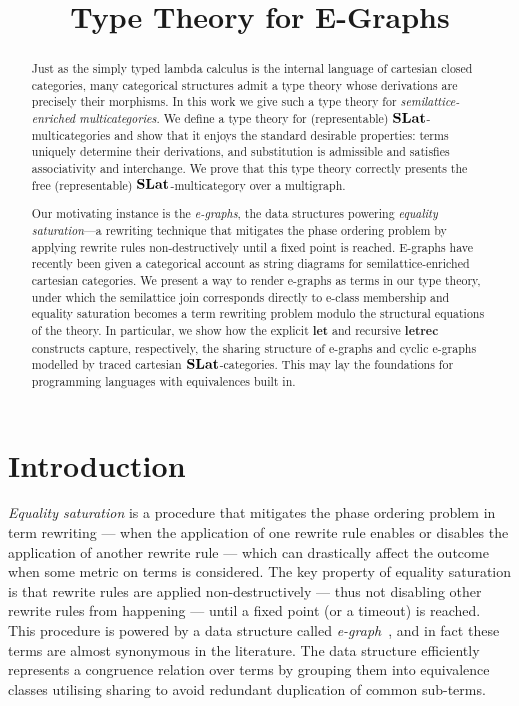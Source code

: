 \documentclass[manuscript, nonacm, anonymous]{acmart}
\title{Type Theory for E-Graphs}
\begin{document}
\begin{abstract}
Just as the simply typed lambda calculus is the internal language of cartesian
closed categories, many categorical structures admit a type theory whose
derivations are precisely their morphisms. In this work we give such a type
theory for \emph{semilattice-enriched multicategories}. We define a type theory
for (representable) $\mathbf{SLat}$-multicategories and show that it enjoys the
standard desirable properties: terms uniquely determine their derivations, and
substitution is admissible and satisfies associativity and interchange. We prove
that this type theory correctly presents the free (representable)
$\mathbf{SLat}$-multicategory over a multigraph.

Our motivating instance is the \emph{e-graphs}, the data structures powering
\emph{equality saturation}---a rewriting technique that mitigates the phase
ordering problem by applying rewrite rules non-destructively until a fixed point
is reached. E-graphs have recently been given a categorical account as string
diagrams for semilattice-enriched cartesian categories. We present a way to
render e-graphs as terms in our type theory, under which the semilattice join
corresponds directly to e-class membership and equality saturation becomes a
term rewriting problem modulo the structural equations of the theory. In
particular, we show how the explicit \textbf{let} and recursive \textbf{letrec}
constructs capture, respectively, the sharing structure of e-graphs and cyclic
e-graphs modelled by traced cartesian $\mathbf{SLat}$-categories. This may lay
the foundations for programming languages with equivalences built in.
\end{abstract}
\maketitle

\section{Introduction}

\emph{Equality saturation} is a procedure that mitigates the phase ordering problem in term rewriting --- when the application of one rewrite rule enables or disables the application of another rewrite rule --- which can drastically affect the outcome when some metric on terms is considered.
The key property of equality saturation is that rewrite rules are applied non-destructively --- thus not disabling other rewrite rules from happening --- until a fixed point (or a timeout) is reached.
This procedure is powered by a data structure called \emph{e-graph}~\cite{10.1145/1594834.1480915}, and in fact these terms are almost synonymous in the literature.
The data structure efficiently represents a congruence relation over terms by grouping them into equivalence classes utilising sharing to avoid redundant duplication of common sub-terms.
\end{document}
